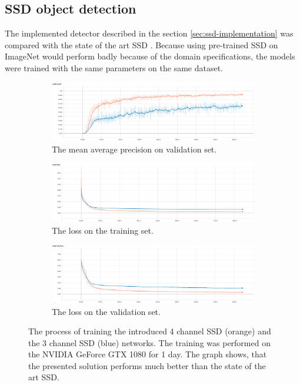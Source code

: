 \documentclass[a4paper,11pt,titlepage,twoside]{article}
\numberwithin{figure}{section}
\begin{document}
\clearpage
\subsection{SSD object detection}
\label{sec:ssd-evaluation}
The implemented detector described in the section \ref{sec:ssd-implementation} was compared with the state of the art SSD \cite{liu2016ssd}. Because using pre-trained SSD on ImageNet would perform badly because of the domain specifications, the models were trained with the same parameters on the same dataset. 

\begin{figure}[H]
    \begin{subfigure}[Sample1]{1\linewidth} 
        \includegraphics[width=1\linewidth]{fig/ssd_compare/mAP.png}
        \caption{The mean average precision on validation set.}   
        \label{fig:ssd_mAP}
    \end{subfigure}
    \begin{subfigure}[Sample1]{1\linewidth} 
        \includegraphics[width=1\linewidth]{fig/ssd_compare/loss.png}
        \caption{The loss on the training set.}   
        \label{fig:ssd_loss}
    \end{subfigure}    
    \begin{subfigure}[Sample1]{1\linewidth} 
        \includegraphics[width=1\linewidth]{fig/ssd_compare/val_loss.png}
        \caption{The loss on the validation set.}   
        \label{fig:ssd_val_loss}
    \end{subfigure}    
    \caption{The process of training the introduced 4 channel SSD (orange) and the 3 channel SSD (blue) networks. The training was performed on the NVIDIA GeForce GTX 1080 for 1 day. The graph shows, that the presented solution performs much better than the state of the art SSD.}
    \label{fig:ssd_training}
\end{figure}
\end{document}
